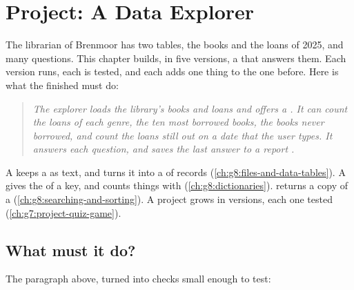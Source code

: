 \chapter{Project: A Data Explorer}\label{ch:g8:project-data-explorer}

The librarian of Brenmoor has two tables, the books and the loans of 2025,
and many questions. This chapter builds, in five versions, a  that
answers them. Each version runs, each is tested, and each adds one thing to
the one before. Here is what the finished  must do:

\begin{quote}
\itshape The explorer loads the library's books and loans and offers a .
It can count the loans of each genre,  the ten most borrowed books, 
the books never borrowed, and count the loans still out on a date that the
user types. It answers each question, and saves the last answer to a report
.
\end{quote}

\begin{recall}
A  keeps a  as text, and  turns it into
a  of records (\cref{ch:g8:files-and-data-tables}). A  gives
the  of a key, and counts things with 
(\cref{ch:g8:dictionaries}).  returns a  copy of a 
(\cref{ch:g8:searching-and-sorting}). A project grows in versions, each one
tested (\cref{ch:g7:project-quiz-game}).
\end{recall}

\section{What must it do?}

The paragraph above, turned into checks small enough to test:

